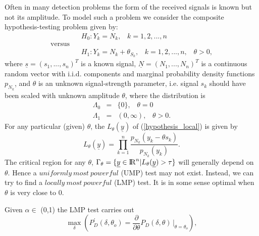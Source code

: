 \documentclass[a4paper,english,12pt]{article}
\begin{document}
\begin{exmp}
Often in many detection problems the form of the received signals is known but not its amplitude. To model such a problem we consider the composite hypothesis-testing problem given by:
\begin{equation}
\begin{split}
\label{hypothesis_local}
&H_{0}: Y_{k} = N_{k}, \hspace{10pt}k=1,2,...,n\\
\text{versus}\hspace{10pt}&
\\&H_{1}: Y_{k} = N_{k}+\theta_{S_{k}}, \hspace{10pt}k=1,2,...,n,\hspace{10pt}\theta>0,
\end{split}
\end{equation}
where $\underline{s}=(s_{1},...,s_{n})^T$ is a known signal, $\underline{N}=(N_{1},...,N_{n})^T$ is a continuous random vector with i.i.d. components and marginal probability density functions $p_{N_{k}}$, and $\theta$ is an unknown signal-strength parameter, i.e. signal $s_{k}$ should have been scaled with unknown amplitude $\theta$, where the distribution is
\begin{eqnarray}
\Lambda_{0}&=&\{0\},\hspace{10pt}\theta=0\nonumber\\
\Lambda_{1}&=&(0,\infty),\hspace{10pt}\theta>0.\nonumber
\end{eqnarray}
For any particular (given) $\theta$, the $L_{\theta}(\underline{y})$ of (\ref{hypothesis_local}) is given by
\begin{equation}
\label{L(y)_theta}
L_{\theta}(\underline{y})=\prod_{k=1}^{n}\frac{p_{N_{k}}(y_{k}-\theta s_{k})}{p_{N_{k}}(y_{k})}.
\end{equation}
The critical region for any $\theta$,
$\Gamma_{\theta}=\{\underline{y}\in{\rm I\!R}^n|L_{\theta}(\underline{y})>\tau\}$ will generally depend on $\theta$. Hence a $uniformly\ most\ powerful$ (UMP) test may not exist. Instead, we can try to find a $locally\ most\ powerful$ (LMP) test. It is in some sense optimal when $\theta$ is very close to 0.
\begin{note}
Given $\alpha\in$ (0,1) the LMP test carries out
\begin{equation}
\max_{\delta} \left(P_{D}^\prime(\delta,\theta_{o})=\frac{\partial}{\partial\theta}P_{D}(\delta,\theta)\hspace{2pt}\Bigg|_{\theta=\theta_{o}} \right),\nonumber

\end{equation}
\end{note}
\end{exmp}
\end{document}
